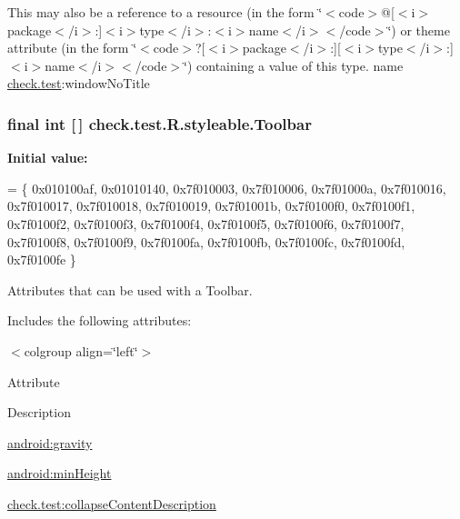 This may also be a reference to a resource (in the form \char`\"{}$<$code$>$@\mbox{[}$<$i$>$package$<$/i$>$\+:\mbox{]}$<$i$>$type$<$/i$>$\+:$<$i$>$name$<$/i$>$$<$/code$>$\char`\"{}) or theme attribute (in the form \char`\"{}$<$code$>$?\mbox{[}$<$i$>$package$<$/i$>$\+:\mbox{]}\mbox{[}$<$i$>$type$<$/i$>$\+:\mbox{]}$<$i$>$name$<$/i$>$$<$/code$>$\char`\"{}) containing a value of this type.  name \hyperlink{namespacecheck_1_1test}{check.\+test}\+:window\+No\+Title \hypertarget{classcheck_1_1test_1_1_r_1_1styleable_a1a7fa90223693abef77e7484cca2df54}{}
\subsubsection[{Toolbar}]{\setlength{\rightskip}{0pt plus 5cm}final int \mbox{[}$\,$\mbox{]} check.\+test.\+R.\+styleable.\+Toolbar\hspace{0.3cm}{\ttfamily [static]}}\label{classcheck_1_1test_1_1_r_1_1styleable_a1a7fa90223693abef77e7484cca2df54}
{\bfseries Initial value\+:}
\begin{DoxyCode}
= \{
            0x010100af, 0x01010140, 0x7f010003, 0x7f010006,
            0x7f01000a, 0x7f010016, 0x7f010017, 0x7f010018,
            0x7f010019, 0x7f01001b, 0x7f0100f0, 0x7f0100f1,
            0x7f0100f2, 0x7f0100f3, 0x7f0100f4, 0x7f0100f5,
            0x7f0100f6, 0x7f0100f7, 0x7f0100f8, 0x7f0100f9,
            0x7f0100fa, 0x7f0100fb, 0x7f0100fc, 0x7f0100fd,
            0x7f0100fe
        \}
\end{DoxyCode}
Attributes that can be used with a Toolbar. 

Includes the following attributes\+:

\begin{TabularC}{0}
\hline
\end{TabularC}
$<$colgroup align=\char`\"{}left\char`\"{}$>$ 

Attribute

Description 

{\ttfamily \hyperlink{classcheck_1_1test_1_1_r_1_1styleable_a573eae0b826181d39d3b0ac3c26b7ec7}{android\+:gravity}}

{\ttfamily \hyperlink{classcheck_1_1test_1_1_r_1_1styleable_a50d77cb71359f8a286d3bcd9212afde6}{android\+:min\+Height}}

{\ttfamily \hyperlink{classcheck_1_1test_1_1_r_1_1styleable_abd8a8ed6f421b71bedf016b8648abba2}{check.\+test\+:collapse\+Content\+Description}}


